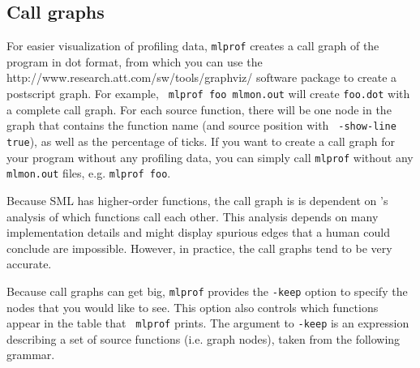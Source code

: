 \subsection{Call graphs}

For easier visualization of profiling data, {\tt mlprof} creates a
call graph of the program in dot format, from which you can use the
		  {http://www.research.att.com/sw/tools/graphviz/}
software package to create a postscript graph.  For example, {\tt
mlprof foo mlmon.out} will create {\tt foo.dot} with a complete call
graph.  For each source function, there will be one node in the graph
that contains the function name (and source position with {\tt
-show-line true}), as well as the percentage of ticks.  If you want to
create a call graph for your program without any profiling data, you
can simply call {\tt mlprof} without any {\tt mlmon.out} files,
e.g. {\tt mlprof foo}.

Because SML has higher-order functions, the call graph is is dependent
on {\mlton}'s analysis of which functions call each other.  This
analysis depends on many implementation details and might display
spurious edges that a human could conclude are impossible.  However,
in practice, the call graphs tend to be very accurate.

Because call graphs can get big, {\tt mlprof} provides the {\tt -keep}
option to specify the nodes that you would like to see.  This
option also controls which functions appear in the table that {\tt
mlprof} prints.  The argument to {\tt -keep} is an expression
describing a set of source functions (i.e. graph nodes), taken from
the following grammar.

